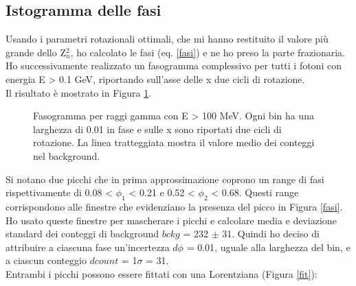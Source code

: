 \documentclass[a4paper,twocolumn]{article}
\begin{document}
\begin{large}
\section{Istogramma delle fasi}
Usando i parametri rotazionali ottimali, che mi hanno restituito il valore più grande dello Z$^2_n$, ho calcolato le fasi (eq. \ref{fasi}) e ne ho preso la parte frazionaria.\\
Ho successivamente realizzato un fasogramma complessivo per tutti i fotoni con energia E > 0.1 GeV, riportando sull'asse delle x due cicli di rotazione.\\
Il risultato è mostrato in Figura \ref{phas1}.

\begin{figure}[h]
    \caption{\small Fasogramma per raggi gamma con E > 100 MeV. Ogni bin ha una larghezza di 0.01 in fase e sulle x sono riportati due cicli di rotazione. La linea tratteggiata mostra il valore medio dei conteggi nel background.}
    \label{phas1}
\end{figure}

\noindent
Si notano due picchi che in prima approssimazione coprono un range di fasi rispettivamente di 0.08 < $\phi_1$ < 0.21 e 0.52 < $\phi_2$ < 0.68. Questi range corrispondono alle finestre che evidenziano la presenza del picco in Figura \ref{fasi}.\\
Ho usato queste finestre per mascherare i picchi e calcolare media e deviazione standard dei conteggi di background $bckg$ = 232 $\pm$ 31. Quindi ho deciso di attribuire a ciascuna fase un'incertezza $d\phi$ = 0.01, uguale alla larghezza del bin, e a ciascun conteggio $dcount$ = 1$\sigma$ = 31.\\
Entrambi i picchi possono essere fittati con una Lorentziana (Figura \ref{fit}):


\end{large}
\end{document}
